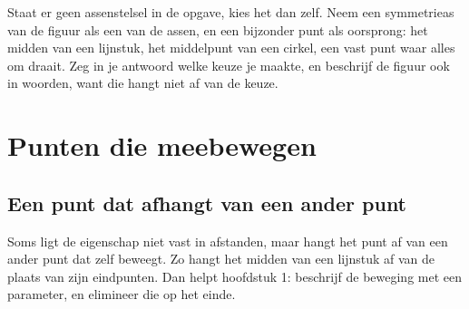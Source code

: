 \begin{werkwijze}
Staat er geen assenstelsel in de opgave, kies het dan zelf. Neem een symmetrieas van de figuur als een van de assen, en een bijzonder punt als oorsprong: het midden van een lijnstuk, het middelpunt van een cirkel, een vast punt waar alles om draait. Zeg in je antwoord welke keuze je maakte, en beschrijf de figuur ook in woorden, want die hangt niet af van de keuze.
\end{werkwijze}


\begin{oefeningen}
\end{oefeningen}

\section{Punten die meebewegen}

\subsection{Een punt dat afhangt van een ander punt}

Soms ligt de eigenschap niet vast in afstanden, maar hangt het punt af van een ander punt dat zelf beweegt. Zo hangt het midden van een lijnstuk af van de plaats van zijn eindpunten. Dan helpt hoofdstuk 1: beschrijf de beweging met een parameter, en elimineer die op het einde.

